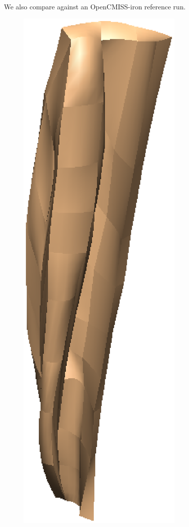 We also compare against an OpenCMISS-iron reference run.
%


%
\begin{figure}[h!]
    \centering
    \includegraphics[width=0.49\columnwidth]{examples/example-0204-u/doc/figures/undeformed_geometry.eps}

\end{figure}
